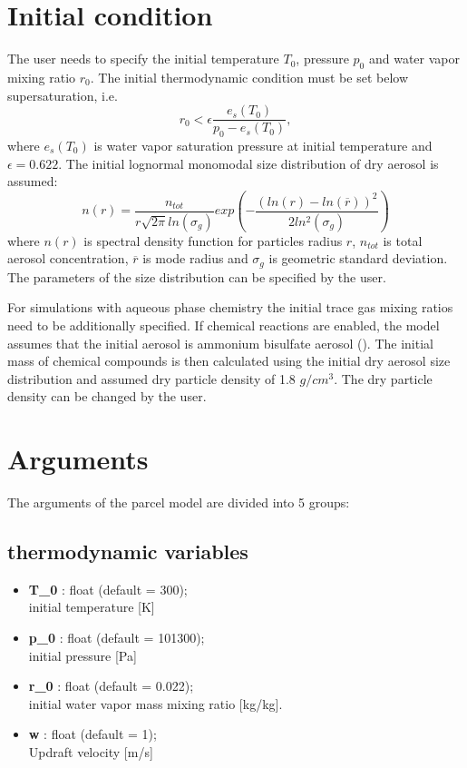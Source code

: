 \documentclass[11pt]{article}
\begin{document}
\section{Initial condition}

The user needs to specify the initial temperature $T_0$, pressure $p_0$ and water vapor mixing ratio $r_0$.
The initial thermodynamic condition must be set below supersaturation, i.e.
\begin{equation}
	r_0 < \epsilon \frac{e_s(T_0)}{p_0 - e_s(T_0)},
\end{equation}
\noindent
where 
  $e_s(T_0)$ is water vapor saturation pressure at initial temperature 
  and $\epsilon = 0.622$.
The initial lognormal monomodal size distribution of dry aerosol is assumed:
\begin{equation}
        n(r) = \frac{n_{tot}}{r\sqrt{2\pi}ln(\sigma_g)}exp\left(-\frac{(ln(r)-ln(\overline{r}))^2}{2ln^2(\sigma_g)}\right)
        \label{lognormalny}
\end{equation}
\noindent
where 
  $n(r)$ is spectral density function for particles radius $r$, 
  $n_{tot}$ is total aerosol concentration, 
  $\overline{r}$ is mode radius and 
  $\sigma_g$ is geometric standard deviation.
The parameters of the size distribution can be specified by the user.

For simulations with aqueous phase chemistry the initial trace gas mixing ratios 
  need to be additionally specified.
If chemical reactions are enabled, the model assumes that 
  the initial aerosol is ammonium bisulfate aerosol ().
The initial mass of chemical compounds is then calculated using the initial 
  dry aerosol size distribution and assumed dry particle density of 1.8 $g/cm^3$.
The dry particle density can be changed by the user.

\section{Arguments}

The arguments of the parcel model are divided into 5 groups:

\subsection{thermodynamic variables}

\begin{itemize}

  \item \textbf{T\_0} : float (default = 300);\\ initial temperature [K]
  \item \textbf{p\_0} : float (default = 101300);\\ initial pressure [Pa]
  \item \textbf{r\_0} : float (default = 0.022);\\ initial water vapor mass mixing ratio [kg/kg].
  \item \textbf{w} : float (default = 1);\\ Updraft velocity [m/s]

\end{itemize}
\end{document}
